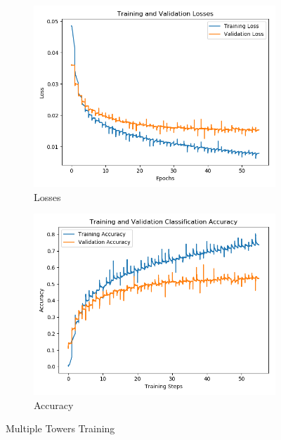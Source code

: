 \begin{figure}[h!]
    \centering
    \begin{subfigure}[b]{0.49\textwidth}
        \includegraphics[width=\textwidth]{figures/classification/blendshape_multi_tower_loss.png}
        \caption{Losses}\label{fig:blendshape_multi_tower_loss}
    \end{subfigure}
    \begin{subfigure}[b]{0.49\textwidth}
        \includegraphics[width=\textwidth]{figures/classification/blendshape_multi_tower_acc.png}
        \caption{Accuracy}\label{fig:blendshape_multi_tower_acc}
    \end{subfigure}
    \caption{Multiple Towers Training}\label{fig:multiple_towers_training}
\end{figure}

